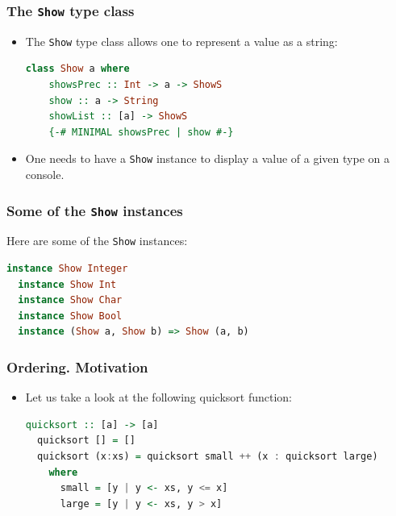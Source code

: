 \documentclass[10pt,pdf,utf8,russian,aspectratio=169]{beamer}
\begin{document}
\begin{frame}[fragile]
  \frametitle{The \verb"Show" type class}

\begin{itemize}
  \item The \verb"Show" type class allows one to represent a value as a string:
  \begin{lstlisting}[language=Haskell]
  class Show a where
    showsPrec :: Int -> a -> ShowS
    show :: a -> String
    showList :: [a] -> ShowS
    {-# MINIMAL showsPrec | show #-}
  \end{lstlisting}
  \item One needs to have a \verb"Show" instance to display a value of a given type on a console.
\end{itemize}
\end{frame}

\begin{frame}[fragile]
  \frametitle{Some of the \verb"Show" instances}

Here are some of the \verb"Show" instances:
\begin{lstlisting}[language=Haskell]
  instance Show Integer
  instance Show Int
  instance Show Char
  instance Show Bool
  instance (Show a, Show b) => Show (a, b)
\end{lstlisting}
\end{frame}

\begin{frame}[fragile]
  \frametitle{Ordering. Motivation}
  \begin{itemize}
  \item Let us take a look at the following quicksort function:

  \begin{lstlisting}[language=Haskell]
  quicksort :: [a] -> [a]
  quicksort [] = []
  quicksort (x:xs) = quicksort small ++ (x : quicksort large)
    where
      small = [y | y <- xs, y <= x]
      large = [y | y <- xs, y > x]
  \end{lstlisting}
\end{itemize}
\end{frame}
\end{document}
